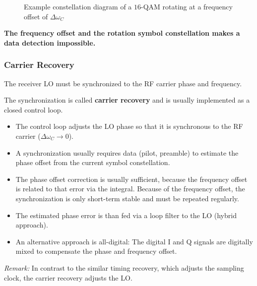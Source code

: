 \begin{refsection}
\begin{figure}[H]
\begin{adjustbox}{scale=1}
	\end{adjustbox}
	\caption{Example constellation diagram of a $16$-\acs{QAM} rotating at a frequency offset of $\Delta \omega_{C}$}
\end{figure}

\textbf{The frequency offset and the rotation symbol constellation makes a data detection impossible.}

\subsubsection{Carrier Recovery}

\begin{fact}
	The receiver \ac{LO} must be synchronized to the \ac{RF} carrier phase and frequency.
\end{fact}

The synchronization is called  \textbf{carrier recovery} and is usually implemented as a closed control loop.
\begin{itemize}
	\item The control loop adjusts the \ac{LO} phase so that it is synchronous to the \ac{RF} carrier ($\Delta \omega_{C} \rightarrow 0$).
	\item A synchronization usually requires data (pilot, preamble) to estimate the phase offset from the current symbol constellation.
	\item The phase offset correction is usually sufficient, because the frequency offset is related to that error via the integral. Because of the frequency offset, the synchronization is only short-term stable and must be repeated regularly.
	\item The estimated phase error is than fed via a loop filter to the \ac{LO} (hybrid approach).
	\item An alternative approach is all-digital: The digital \ac{I} and \ac{Q} signals are digitally mixed to compensate the phase and frequency offset.
\end{itemize}

\textit{Remark:} In contrast to the similar timing recovery, which adjusts the sampling clock, the carrier recovery adjusts the \ac{LO}.


\end{refsection}
